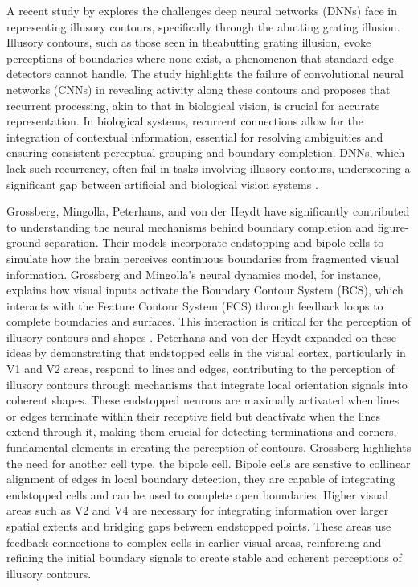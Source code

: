 \documentclass[12pt]{article}
\begin{document}
A recent study by \textcite{fanChallengingDeepLearning2023} explores the challenges deep neural networks (DNNs) face in representing illusory contours, specifically through the abutting grating illusion. Illusory contours, such as those seen in theabutting grating illusion, evoke perceptions of boundaries where none exist, a phenomenon that standard edge detectors cannot handle. The study highlights the failure of convolutional neural networks (CNNs) in revealing activity along these contours and proposes that recurrent processing, akin to that in biological vision, is crucial for accurate representation. In biological systems, recurrent connections allow for the integration of contextual information, essential for resolving ambiguities and ensuring consistent perceptual grouping and boundary completion. DNNs, which lack such recurrency, often fail in tasks involving illusory contours, underscoring a significant gap between artificial and biological vision systems \autocite{fanChallengingDeepLearning2023}.

Grossberg, Mingolla, Peterhans, and von der Heydt have significantly contributed to understanding the neural mechanisms behind boundary completion and figure-ground separation. Their models incorporate endstopping and bipole cells to simulate how the brain perceives continuous boundaries from fragmented visual information. Grossberg and Mingolla's neural dynamics model, for instance, explains how visual inputs activate the Boundary Contour System (BCS), which interacts with the Feature Contour System (FCS) through feedback loops to complete boundaries and surfaces. This interaction is critical for the perception of illusory contours and shapes \autocite{grossbergTextureSegregationSurface1998}. Peterhans and von der Heydt expanded on these ideas by demonstrating that endstopped cells in the visual cortex, particularly in V1 and V2 areas, respond to lines and edges, contributing to the perception of illusory contours through mechanisms that integrate local orientation signals into coherent shapes\autocite{grossbergTextureSegregationSurface1998}. These endstopped neurons are maximally activated when lines or edges terminate within their receptive field but deactivate when the lines extend through it, making them crucial for detecting terminations and corners, fundamental elements in creating the perception of contours. Grossberg highlights the need for another cell type, the bipole cell. Bipole cells are senstive to collinear alignment of edges in local boundary detection, they are capable of integrating endstopped cells and can be used to complete open boundaries. Higher visual areas such as V2 and V4 are necessary for integrating information over larger spatial extents and bridging gaps between endstopped points. These areas use feedback connections to complex cells in earlier visual areas, reinforcing and refining the initial boundary signals to create stable and coherent perceptions of illusory contours.
\end{document}

